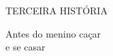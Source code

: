 



\pagebreak
\thispagestyle{empty}
\mbox{}
\begin{center}
\vspace{4cm}
{\formularlight\small TERCEIRA HISTÓRIA}

\medskip

{\formular\huge Antes do menino caçar\\\vspace{0.2cm} e se casar}
\end{center}
\pagebreak

